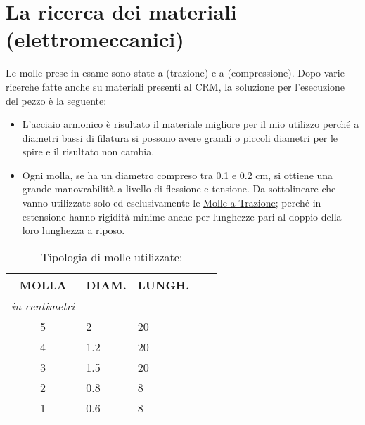 
\chapter{La ricerca dei materiali (elettromeccanici)}
\label{chp:La ricerca dei materiali (elettromeccanici)}

Le molle prese in esame sono state a (trazione) e a (compressione).
Dopo varie ricerche fatte anche su materiali presenti al CRM, la soluzione per l'esecuzione del pezzo è la seguente:

\begin{itemize}
\item{L'acciaio armonico è risultato il materiale migliore per il mio utilizzo perché a diametri bassi di filatura si possono avere grandi o piccoli diametri per le spire e il risultato non cambia.}
\item{Ogni molla, se ha un diametro compreso tra 0.1 e 0.2 cm, si ottiene una grande manovrabilità a livello di flessione e tensione. Da sottolineare che vanno utilizzate solo ed esclusivamente le \underline {Molle a Trazione}; perché in estensione hanno rigidità minime anche per lunghezze pari al doppio della loro lunghezza a riposo.}
\end{itemize}

\begin{table}[htp]
\caption{Tipologia di molle utilizzate:}
\begin{center}

\begin{tabular}{cp{2cm}p{2cm}p{.2cm}p{2cm}} \textbf{MOLLA}&\textbf{DIAM.}&\textbf{LUNGH.}\\
\hline \textit{in centimetri} \\
\hline 5&2&20\\
\hline 4&1.2&20\\
\hline 3&1.5&20\\
\hline 2&0.8&8\\
\hline 1&0.6&8\\
\end{tabular}

\end{center}
\label{default}
\end{table}%



